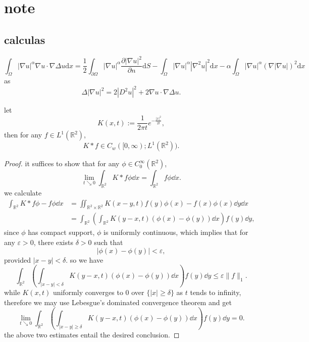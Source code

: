 
\chapter{note}
\section{calculas}
\begin{equation}
	\int_\Omega |\nabla u|^\alpha \nabla u \cdot \nabla\Delta u\mathrm{d}x = \frac{1}{2}\int_{\partial \Omega} |\nabla u|^\alpha \frac{\partial |\nabla u|^2}{\partial n}\mathrm{d}S - \int_\Omega |\nabla u|^\alpha |\nabla^2u|^2\mathrm{d}x - \alpha \int_\Omega |\nabla u|^\alpha (\nabla |\nabla u|)^2\mathrm{d}x
\end{equation}
as \begin{equation}
	\nonumber
	\Delta|\nabla u|^2 = 2|D^2u|^2 + 2\nabla u \cdot \nabla \Delta u.
\end{equation}

\begin{proposition}
	let 
	\[
		K(x,t) := \frac{1}{2\pi t}e^{-\frac{|x|^2}{2t}},
	\]
	then for any $f\in L^1(\mathbb{R}^2)$,
	\[
		K*f\in C_w([0,\infty);L^1(\mathbb{R}^2)).
	\]
\end{proposition}
\begin{proof}
	it suffices to show that for any $\phi\in C_0^\infty(\mathbb{R}^2)$,
	\[
		\lim_{t\searrow0}\int_{\mathbb{R}^2}K*f\phi\dd x = \int_{\mathbb{R}^2}f\phi\dd x.
	\]
	we calculate 
	\begin{align*}
		\int_{\mathbb{R}^2}K*f\phi - f\phi\dd x
		&= \iint_{\mathbb{R}^2\times\mathbb{R}^2}K(x-y,t)f(y)\phi(x) - f(x)\phi(x)\dd y\dd x\\
		&= \int_{\mathbb{R}^2}\left(\int_{\mathbb{R}^2}K(y-x,t)(\phi(x)-\phi(y))\dd x\right)f(y)\dd y,
	\end{align*}
	since $\phi$ has compact support, $\phi$ is uniformly continuous, which implies that
	for any $\varepsilon>0$, there exists $\delta>0$ such that 
	\[
		|\phi(x)-\phi(y)|<\varepsilon,
	\]
	provided $|x-y| < \delta$.
	so we have 
	\[
		\int_{\mathbb{R}^2}\left(\int_{|x-y|<\delta}K(y-x,t)(\phi(x)-\phi(y))\dd x\right)f(y)\dd y 
			\leq \varepsilon \|f\|_1.
	\]
	while $K(x,t)$ uniformly converges to $0$ over $\{|x|\geq\delta\}$ as $t$ tends to infinity, 
	therefore we may use Lebesgue's dominated convergence theorem and get
	\[
		\lim_{t\searrow0} \int_{\mathbb{R}^2}\left(\int_{|x-y|\geq\delta}K(y-x,t)(\phi(x)-\phi(y))\dd x\right)f(y)\dd y = 0.
	\] 
	the above two estimates entail the desired conclusion.
\end{proof}

